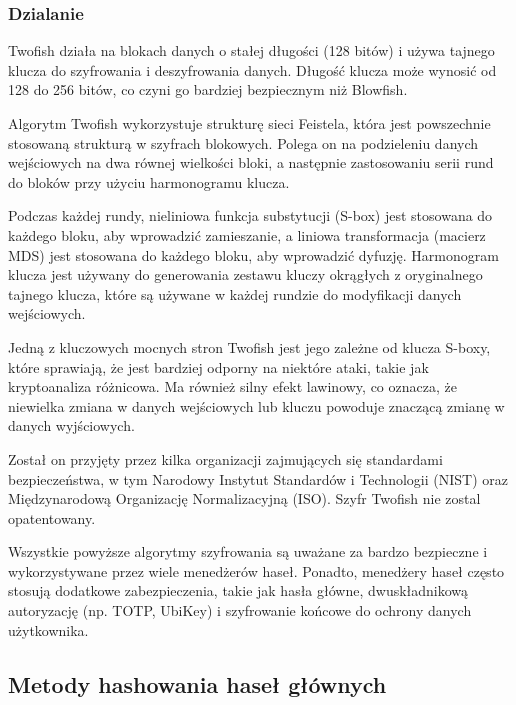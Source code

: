 \subsubsection{Dzialanie}
Twofish działa na blokach danych o stałej długości (128 bitów) i używa tajnego klucza do szyfrowania i deszyfrowania danych. Długość klucza może wynosić od 128 do 256 bitów, co czyni go bardziej bezpiecznym niż Blowfish.

Algorytm Twofish wykorzystuje strukturę sieci Feistela, która jest powszechnie stosowaną strukturą w szyfrach blokowych. Polega on na podzieleniu danych wejściowych na dwa równej wielkości bloki, a następnie zastosowaniu serii rund do bloków przy użyciu harmonogramu klucza.

Podczas każdej rundy, nieliniowa funkcja substytucji (S-box) jest stosowana do każdego bloku, aby wprowadzić zamieszanie, a liniowa transformacja (macierz MDS) jest stosowana do każdego bloku, aby wprowadzić dyfuzję. Harmonogram klucza jest używany do generowania zestawu kluczy okrągłych z oryginalnego tajnego klucza, które są używane w każdej rundzie do modyfikacji danych wejściowych.

Jedną z kluczowych mocnych stron Twofish jest jego zależne od klucza S-boxy, które sprawiają, że jest bardziej odporny na niektóre ataki, takie jak kryptoanaliza różnicowa. Ma również silny efekt lawinowy, co oznacza, że niewielka zmiana w danych wejściowych lub kluczu powoduje znaczącą zmianę w danych wyjściowych.

Został on przyjęty przez kilka organizacji zajmujących się standardami bezpieczeństwa, w tym Narodowy Instytut Standardów i Technologii (NIST) oraz Międzynarodową Organizację Normalizacyjną (ISO). Szyfr Twofish nie zostal opatentowany. 


Wszystkie powyższe algorytmy szyfrowania są uważane za bardzo bezpieczne i wykorzystywane przez wiele menedżerów haseł. Ponadto, menedżery haseł często stosują dodatkowe zabezpieczenia, takie jak hasła główne, dwuskładnikową autoryzację (np. TOTP, UbiKey) i szyfrowanie końcowe do ochrony danych użytkownika.

\subsection{Metody hashowania haseł głównych}

